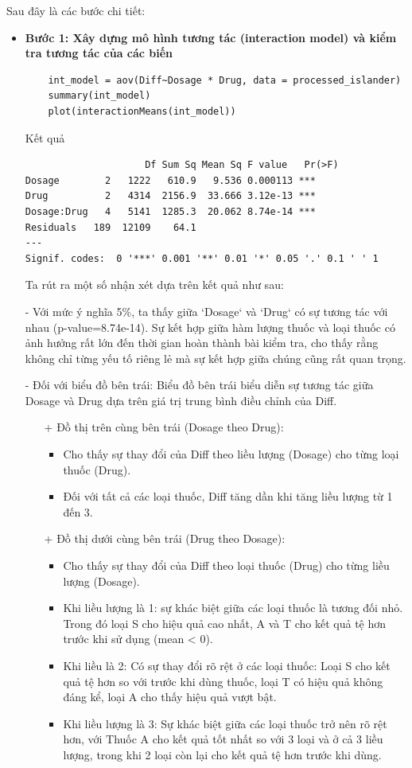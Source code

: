 Sau đây là các bước chi tiết:
\begin{itemize}
    \item \textbf{Bước 1: Xây dựng mô hình tương tác (interaction model) và kiểm tra tương tác của các biến}

    \begin{lstlisting}
    int_model = aov(Diff~Dosage * Drug, data = processed_islander)
    summary(int_model)
    plot(interactionMeans(int_model))
    \end{lstlisting}

    Kết quả
    \begin{lstlisting}
                     Df Sum Sq Mean Sq F value   Pr(>F)    
Dosage        2   1222   610.9   9.536 0.000113 ***
Drug          2   4314  2156.9  33.666 3.12e-13 ***
Dosage:Drug   4   5141  1285.3  20.062 8.74e-14 ***
Residuals   189  12109    64.1                     
---
Signif. codes:  0 '***' 0.001 '**' 0.01 '*' 0.05 '.' 0.1 ' ' 1
    \end{lstlisting}
Ta rút ra một số nhận xét dựa trên kết quả như sau: 

- Với mức ý nghĩa 5\%, ta thấy giữa `Dosage` và `Drug` có sự tương tác với nhau (p-value=8.74e-14). Sự kết hợp giữa hàm lượng thuốc và loại thuốc có ảnh hưởng rất lớn đến thời gian hoàn thành bài kiểm tra, cho thấy rằng không chỉ từng yếu tố riêng lẻ mà sự kết hợp giữa chúng cũng rất quan trọng.

- Đối với biểu đồ bên trái: Biểu đồ bên trái biểu diễn sự tương tác giữa Dosage và Drug dựa trên giá trị trung bình điều chỉnh của Diff.
    \begin{itemize}
        \item [+]  Đồ thị trên cùng bên trái (Dosage theo Drug):
        \begin{itemize}
            \item Cho thấy sự thay đổi của Diff theo liều lượng (Dosage) cho từng loại thuốc (Drug).
            \item Đối với tất cả các loại thuốc, Diff tăng dần khi tăng liều lượng từ 1 đến 3.
        \end{itemize}
        \item [+]  Đồ thị dưới cùng bên trái (Drug theo Dosage):
        \begin{itemize}
            \item Cho thấy sự thay đổi của Diff theo loại thuốc (Drug) cho từng liều lượng (Dosage).
            \item Khi liều lượng là 1: sự khác biệt giữa các loại thuốc là tương đối nhỏ. Trong đó loại S cho hiệu quả cao nhất, A và T cho kết quả tệ hơn trước khi sử dụng (mean < 0).
            \item Khi liều là 2: Có sự thay đổi rõ rệt ở các loại thuốc: Loại S cho kết quả tệ hơn so với trước khi dùng thuốc, loại T có hiệu quả không đáng kể, loại A cho thấy hiệu quả vượt bật.
            \item Khi liều lượng là 3: Sự khác biệt giữa các loại thuốc trở nên rõ rệt hơn, với Thuốc A cho kết quả tốt nhất so với 3 loại và ở cả 3 liều lượng, trong khi 2 loại còn lại cho kết quả tệ hơn trước khi dùng.
        \end{itemize}
    \end{itemize}


\end{itemize}
